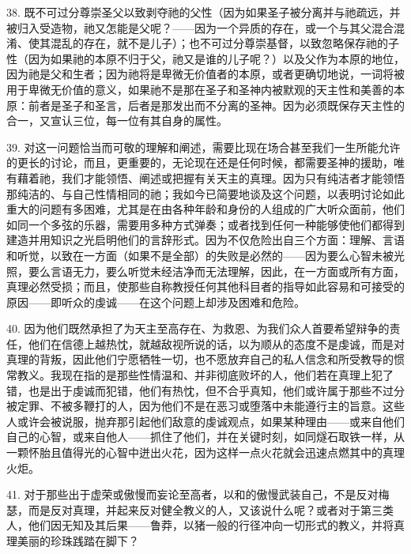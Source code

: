 38. 既不可过分尊崇圣父以致剥夺祂的父性（因为如果圣子被分离并与祂疏远，并被归入受造物，祂又怎能是父呢？——因为一个异质的存在，或一个与其父混合混淆、使其混乱的存在，就不是儿子）；也不可过分尊崇基督，以致忽略保存祂的子性（因为如果祂的本原不归于父，祂又是谁的儿子呢？）以及父作为本原的地位，因为祂是父和生者；因为祂将是卑微无价值者的本原，或者更确切地说，一词将被用于卑微无价值的意义，如果祂不是那在圣子和圣神内被默观的天主性和美善的本原：前者是圣子和圣言，后者是那发出而不分离的圣神。因为必须既保存天主性的合一，又宣认三位，每一位有其自身的属性。\par

39. 对这一问题恰当而可敬的理解和阐述，需要比现在场合甚至我们一生所能允许的更长的讨论，而且，更重要的，无论现在还是任何时候，都需要圣神的援助，唯有藉着祂，我们才能领悟、阐述或把握有关天主的真理。因为只有纯洁者才能领悟那纯洁的、与自己性情相同的祂；我如今已简要地谈及这个问题，以表明讨论如此重大的问题有多困难，尤其是在由各种年龄和身份的人组成的广大听众面前，他们如同一个多弦的乐器，需要用多种方式弹奏；或者找到任何一种能够使他们都得到建造并用知识之光启明他们的言辞形式。因为不仅危险出自三个方面：理解、言语和听觉，以致在一方面（如果不是全部）的失败是必然的——因为要么心智未被光照，要么言语无力，要么听觉未经洁净而无法理解，因此，在一方面或所有方面，真理必然受损；而且，使那些自称教授任何其他科目者的指导如此容易和可接受的原因——即听众的虔诚——在这个问题上却涉及困难和危险。\par

40. 因为他们既然承担了为天主至高存在、为救恩、为我们众人首要希望辩争的责任，他们在信德上越热忱，就越敌视所说的话，以为顺从的态度不是虔诚，而是对真理的背叛，因此他们宁愿牺牲一切，也不愿放弃自己的私人信念和所受教导的惯常教义。我现在指的是那些性情温和、并非彻底败坏的人，他们若在真理上犯了错，也是出于虔诚而犯错，他们有热忱，但不合乎真知，他们或许属于那些不过分被定罪、不被多鞭打的人，因为他们不是在恶习或堕落中未能遵行主的旨意。这些人或许会被说服，抛弃那引起他们敌意的虔诚观点，如果某种理由——或来自他们自己的心智，或来自他人——抓住了他们，并在关键时刻，如同燧石取铁一样，从一颗怀胎且值得光的心智中迸出火花，因为这样一点火花就会迅速点燃其中的真理火炬。\par

41. 对于那些出于虚荣或傲慢而妄论至高者，以和的傲慢武装自己，不是反对梅瑟，而是反对真理，并起来反对健全教义的人，又该说什么呢？或者对于第三类人，他们因无知及其后果——鲁莽，以猪一般的行径冲向一切形式的教义，并将真理美丽的珍珠践踏在脚下？\par

